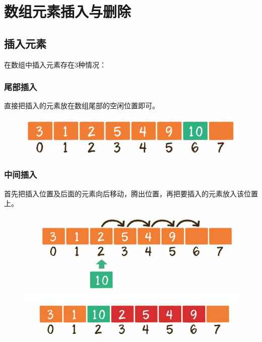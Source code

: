 \newpage

\section{数组元素插入与删除}

\subsection{插入元素}

在数组中插入元素存在3种情况：

\subsubsection{尾部插入}

直接把插入的元素放在数组尾部的空闲位置即可。

\begin{figure}[H]
    \centering
    \includegraphics[scale=0.9]{img/C2/2-3/1.png}
\end{figure}

\subsubsection{中间插入}

首先把插入位置及后面的元素向后移动，腾出位置，再把要插入的元素放入该位置上。

\begin{figure}[H]
    \centering
    \includegraphics[scale=0.9]{img/C2/2-3/2.png}
\end{figure}

